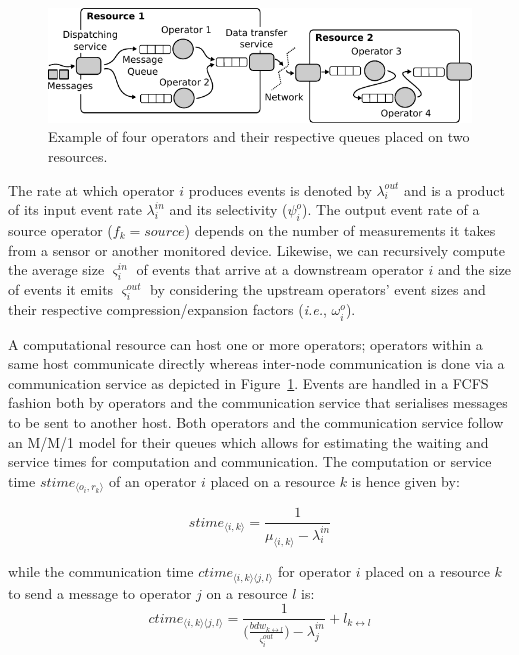 \begin{figure}
  \centering
  \includegraphics[width=1\columnwidth]{Figures/resource_model.pdf}
  \caption{Example of four operators and their respective queues placed on two resources.}
  \label{fig:deployment}
\end{figure}

The rate at which operator $i$ produces events is denoted by $\lambda_i^{out}$ and is a product of its input event rate $\lambda_i^{in}$ and its selectivity ($\psi^o_i$). The output event rate of a source operator ($f_k=source$) depends on the number of measurements it takes from a sensor or another monitored device. Likewise, we can recursively compute the average size $\varsigma_i^{in}$ of events that arrive at a downstream operator $i$ and the size of events it emits $\varsigma_i^{out}$ by considering the upstream operators' event sizes and their respective compression/expansion factors (\textit{i.e.}, $\omega^o_i$).

A computational resource can host one or more operators; operators within a same host communicate directly whereas inter-node communication is done via a communication service as depicted in Figure~\ref{fig:deployment}. Events are handled in a \ac{FCFS} fashion both by operators and the communication service that serialises messages to be sent to another host. Both operators and the communication service follow an M/M/1 model for their queues which allows for estimating the waiting and service times for computation and communication. The computation or service time $stime_{\langle o_i,r_k\rangle}$ of an operator $i$ placed on a resource $k$ is hence given by:

\begin{equation}
stime_{\langle i,k\rangle} = \frac{1}{\mu_{\langle i,k\rangle} - \lambda_{i}^{in}}
\label{eq:computation}
\end{equation}

\noindent while the communication time $ctime_{\langle i,k\rangle\langle j,l\rangle}$ for operator $i$ placed on a resource $k$ to send a message to operator $j$ on a resource $l$ is:
\begin{equation}
ctime_{\langle i,k\rangle\langle j,l\rangle} = \frac{1}{\Big(\frac{bdw_{k\leftrightarrow l}}{\varsigma_{i}^{out}}\Big) - \lambda_{j}^{in}} + l_{k\leftrightarrow l}
\label{eq:communication}
\end{equation}

